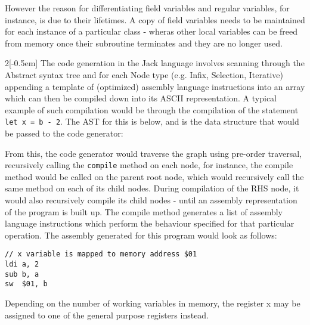 However the reason for differentiating field variables and regular variables, for instance, is due to their lifetimes. A copy of field variables needs to be maintained for each instance of a particular class - wheras other local variables can be freed from memory once their subroutine terminates and they are no longer used.


\vspace*{-2em}
\begin{multicols}{2}[\columnsep-0.5em] 
    The code generation in the Jack language involves scanning through the Abstract syntax tree and for each Node type (e.g. Infix, Selection, Iterative) appending a template of (optimized) assembly language instructions into an array which can then be compiled down into its ASCII representation. A typical example of such compilation would be through the compilation of the statement \texttt{let x = b - 2}. The AST for this is below, and is the data structure that would be passed to the code generator:

    \columnbreak

\end{multicols}

\bigskip


\bigskip

From this, the code generator would traverse the graph using pre-order traversal, recursively calling the \texttt{compile} method on each node, for instance, the compile method would be called on the parent root node, which would recursively call the same method on each of its child nodes. During compilation of the RHS node, it would also recursively compile its child nodes - until an assembly representation of the program is built up. The compile method generates a list of assembly language instructions which perform the behaviour specified for that particular operation. The assembly generated for this program would look as follows:
\begin{lstlisting}
// x variable is mapped to memory address $01 
ldi a, 2
sub b, a 
sw  $01, b
\end{lstlisting}
Depending on the number of working variables in memory, the register x may be assigned to one of the general purpose registers instead.

